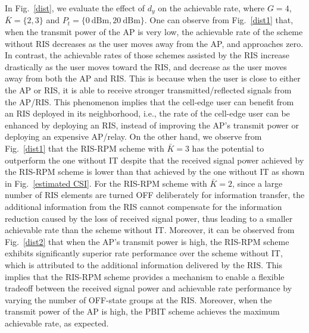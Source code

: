 \documentclass[draftclsnofoot,onecolumn,12pt]{IEEEtran}
\newcommand{\revh}[1]{{\color{black}#1}} %
\newcommand{\revh}[1]{#1}
\begin{document}
In Fig.~\ref{dist}, we evaluate the effect of $d_y$ on the achievable rate, where $G=4$,  ${\bar K}=\{2,3\}$ and $P_t=\{0~\text{dBm}, 20~\text{dBm}\}$. 
One can observe from Fig.~\ref{dist1} that, when the transmit power of the AP is very low, the achievable rate of the scheme without RIS decreases as the user moves away from the AP, and approaches zero. In contrast, the achievable rates of those schemes assisted by the RIS increase drastically as the user moves toward the RIS, and decrease as the user moves away from both the AP and RIS. 
This is because when the user is close to either the AP or RIS, it is able to receive stronger transmitted/reflected signals from the AP/RIS. This phenomenon implies that the cell-edge user can benefit from an RIS deployed in its neighborhood, i.e., the rate of the cell-edge user can be enhanced by deploying an RIS, instead of improving the AP's transmit power or deploying an expensive AP/relay. 
On the other hand, we observe from Fig.~\ref{dist1} that the RIS-RPM scheme with ${\bar K}=3$ has the potential to outperform the one without IT despite that the received signal power achieved by the RIS-RPM scheme is lower than that achieved by the one without IT as shown in Fig.~\ref{estimated CSI}. 
For the RIS-RPM scheme with ${\bar K}=2$, since a large number of RIS elements are turned OFF deliberately for information transfer, the additional information from the RIS cannot compensate for the information reduction caused by the loss of received signal power, thus leading to a smaller achievable rate than the scheme without IT. 
Moreover, it can be observed from Fig.~\ref{dist2} that when the AP's transmit power is high, the RIS-RPM scheme exhibits significantly superior rate performance over the scheme without IT, which is attributed to the additional information delivered by the RIS. 
This implies that the RIS-RPM scheme provides a mechanism to enable a flexible tradeoff between the received signal power and achievable rate performance by varying the number of OFF-state groups at the RIS.  
\revh{Moreover, when the transmit power of the AP is high, the PBIT scheme achieves the maximum achievable rate, as expected.} 
\end{document}
